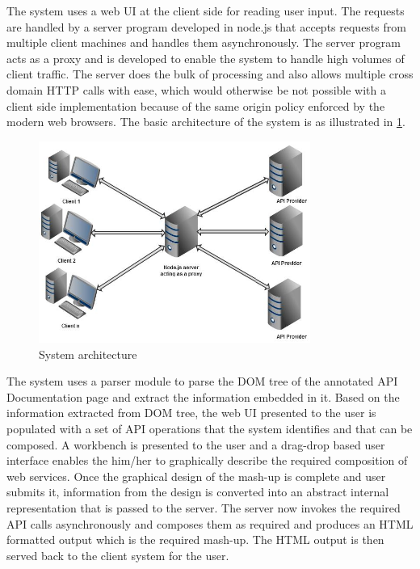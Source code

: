 \documentclass[journal]{IEEEtran}
\begin{document}
The system uses a web UI at the client side for reading user input. The requests are handled by a server program developed in node.js that accepts requests from multiple client machines and handles them asynchronously. The server program acts as a proxy and is developed to enable the system to handle high volumes of client traffic. The server does the bulk of processing and also allows multiple cross domain HTTP calls with ease, which would otherwise be not possible with a client side implementation because of the same origin policy enforced by the modern web browsers.
The basic architecture of the system is as illustrated in \ref{fig:sys_arch}.
\begin{figure}[!ht]
    \centering
    \includegraphics[width=3.5in]{images/sys_arch.png}
    \caption{System architecture}
    \label{fig:sys_arch}
\end{figure}

The system uses a parser module to parse the DOM tree of the annotated API Documentation page and extract the information embedded in it. Based on the information extracted from DOM tree, the web UI presented to the user is populated with a set of API operations that the system identifies and that can be composed. A workbench is presented to the user and a drag-drop based user interface enables the him/her to graphically describe the required composition of web services. Once the graphical design of the mash-up is complete and user submits it, information from the design is converted into an abstract internal representation that is passed to the server. The server now invokes the required API calls asynchronously and composes them as required and produces an HTML formatted output which is the required mash-up. The HTML output is then served back to the client system for the user.
\end{document}
